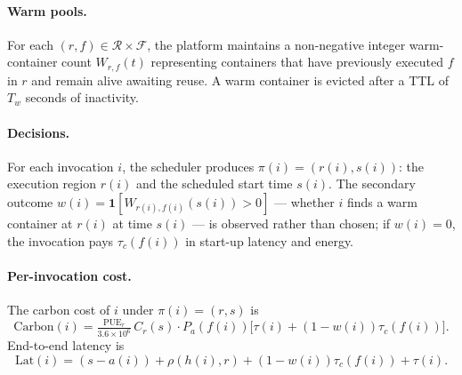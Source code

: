 \paragraph{Warm pools.} For each $(r, f) \in \mathcal{R} \times
\mathcal{F}$, the platform maintains a non-negative integer
warm-container count $W_{r,f}(t)$ representing containers that have
previously executed $f$ in $r$ and remain alive awaiting reuse. A
warm container is evicted after a TTL of $T_w$ seconds of inactivity.

\paragraph{Decisions.} For each invocation $i$, the scheduler produces
$\pi(i) = (r(i), s(i))$: the execution region $r(i)$ and the
scheduled start time $s(i)$. The secondary outcome
$w(i) = \mathbf{1}[W_{r(i), f(i)}(s(i)) > 0]$ --- whether $i$ finds a
warm container at $r(i)$ at time $s(i)$ --- is observed rather than
chosen; if $w(i) = 0$, the invocation pays $\tau_c(f(i))$ in
start-up latency and energy.

\paragraph{Per-invocation cost.} The carbon cost of $i$ under
$\pi(i) = (r, s)$ is
\begin{equation*}
\mathrm{Carbon}(i) = \tfrac{\mathrm{PUE}_r}{3.6 \times 10^6}\,C_r(s)
\cdot P_a(f(i))\big[\tau(i) + (1-w(i))\tau_c(f(i))\big].
\end{equation*}
End-to-end latency is
\begin{equation*}
\mathrm{Lat}(i) = (s - a(i)) + \rho(h(i), r) + (1-w(i))\tau_c(f(i)) + \tau(i).
\end{equation*}

